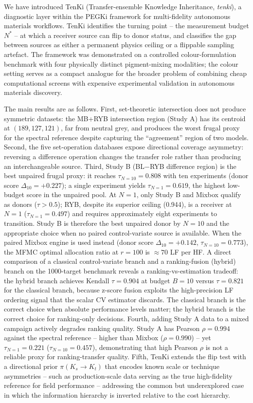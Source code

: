 \documentclass[twoside,twocolumn,9pt]{article}
\begin{document}
We have introduced TenKi (Transfer-ensemble Knowledge Inheritance, \textit{tenki}), a diagnostic layer within the PEGKi framework for multi-fidelity autonomous materials workflows. TenKi identifies the turning point -- the measurement budget $N^*$ -- at which a receiver source can flip to donor status, and classifies the gap between sources as either a permanent physics ceiling or a flippable sampling artefact. The framework was demonstrated on a controlled colour-formulation benchmark with four physically distinct pigment-mixing modalities; the colour setting serves as a compact analogue for the broader problem of combining cheap computational screens with expensive experimental validation in autonomous materials discovery.

The main results are as follows. First, set-theoretic intersection does not produce symmetric datasets: the MB+RYB intersection region (Study A) has its centroid at $(189, 127, 121)$, far from neutral grey, and produces the worst frugal proxy for the spectral reference despite capturing the ``agreement'' region of two models. Second, the five set-operation databases expose directional coverage asymmetry: reversing a difference operation changes the transfer role rather than producing an interchangeable source. Third, Study B (BL$-$RYB difference region) is the best unpaired frugal proxy: it reaches $\tau_{N=10} = 0.808$ with ten experiments (donor score $\Delta_{10} = +0.227$); a single experiment yields $\tau_{N=1} = 0.619$, the highest low-budget score in the unpaired pool. At $N=1$, only Study B and Mixbox qualify as donors ($\tau > 0.5$); RYB, despite its superior ceiling (0.944), is a receiver at $N=1$ ($\tau_{N=1} = 0.497$) and requires approximately eight experiments to transition. Study B is therefore the best unpaired donor by $N=10$ and the appropriate choice when no paired control-variate source is available. When the paired Mixbox engine is used instead (donor score $\Delta_{10} = +0.142$, $\tau_{N=10} = 0.773$), the MFMC optimal allocation ratio at $r=100$ is $\approx 70$ LF per HF. A direct comparison of a classical control-variate branch and a ranking-fusion (hybrid) branch on the 1000-target benchmark reveals a ranking-vs-estimation tradeoff: the hybrid branch achieves Kendall $\tau = 0.904$ at budget $B=10$ versus $\tau = 0.821$ for the classical branch, because z-score fusion exploits the high-precision LF ordering signal that the scalar CV estimator discards. The classical branch is the correct choice when absolute performance levels matter; the hybrid branch is the correct choice for ranking-only decisions. Fourth, adding Study A data to a mixed campaign actively degrades ranking quality. Study A has Pearson $\rho = 0.994$ against the spectral reference -- higher than Mixbox ($\rho = 0.990$) -- yet $\tau_{N=1} = 0.221$ ($\tau_{N=10} = 0.457$), demonstrating that high Pearson $\rho$ is not a reliable proxy for ranking-transfer quality. Fifth, TenKi extends the flip test with a directional prior $\pi(K_s \to K_t)$ that encodes known scale or technique asymmetries -- such as production-scale data serving as the true high-fidelity reference for field performance -- addressing the common but underexplored case in which the information hierarchy is inverted relative to the cost hierarchy.
\end{document}
